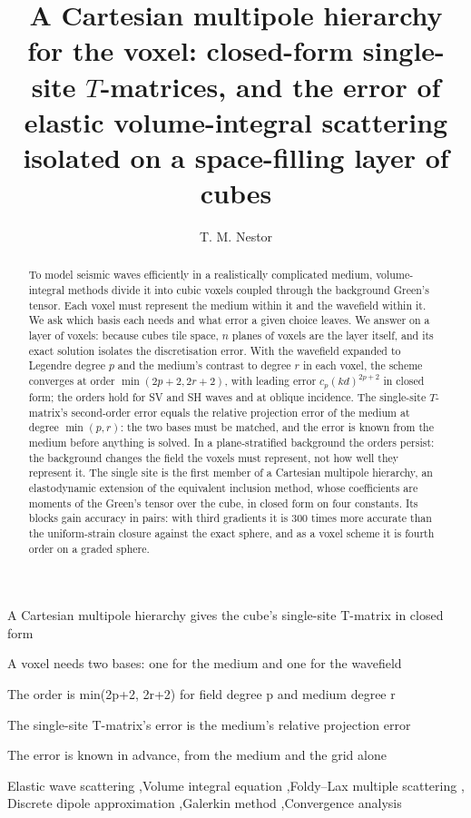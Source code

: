 \documentclass[preprint,review,12pt]{elsarticle}
\begin{document}
\begin{frontmatter}
\title{A Cartesian multipole hierarchy for the voxel: closed-form single-site $T$-matrices, and the
error of elastic volume-integral scattering isolated on a space-filling layer of cubes}
\author{T. M. Nestor}

\begin{abstract}

To model seismic waves efficiently in a realistically complicated medium, volume-integral
methods divide it into cubic voxels coupled through the background Green's tensor.
Each voxel must represent the medium within it and the wavefield within it. We ask which basis each
needs and what error a given choice leaves.
We answer on a layer of voxels: because cubes tile space, $n$ planes of voxels are the layer itself,
and its exact solution isolates the discretisation error. With the wavefield expanded to
Legendre degree $p$ and the
medium's contrast to degree $r$ in each voxel, the scheme converges at order $\min(2p+2,2r+2)$, with
leading error $c_p(kd)^{2p+2}$ in closed form; the orders hold for SV and SH waves and at oblique
incidence. The single-site $T$-matrix's second-order error equals the relative projection error of the
medium at degree $\min(p,r)$: the two bases must be matched, and the error is known from the medium
before anything is solved. In a plane-stratified background the orders persist: the background changes
the field the voxels must represent, not how well they represent it. The single site is the first member
of a Cartesian multipole hierarchy, an elastodynamic extension of the equivalent inclusion
method, whose coefficients are moments of the Green's tensor over the cube, in closed form on four
constants. Its blocks gain accuracy in pairs:
with third gradients it is 300 times more accurate than the uniform-strain closure against
the exact sphere, and as a voxel scheme it is fourth order on a graded
sphere.
\end{abstract}

\begin{highlights}
\item A Cartesian multipole hierarchy gives the cube's single-site T-matrix in closed form
\item A voxel needs two bases: one for the medium and one for the wavefield
\item The order is min(2p+2, 2r+2) for field degree p and medium degree r
\item The single-site T-matrix's error is the medium's relative projection error
\item The error is known in advance, from the medium and the grid alone
\end{highlights}

\begin{keyword}
Elastic wave scattering \sep Volume integral equation \sep Foldy--Lax multiple scattering \sep
Discrete dipole approximation \sep Galerkin method \sep Convergence analysis
\end{keyword}
\end{frontmatter}
\end{document}
